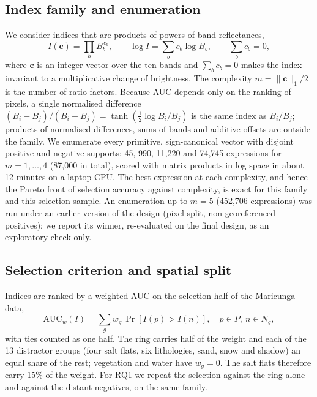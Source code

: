 \documentclass[preprint,authoryear,number]{elsarticle}
\begin{document}
\subsection{Index family and enumeration}
\label{sec:enumeration}

We consider indices that are products of powers of band reflectances,
\begin{equation}
I(\mathbf{c}) = \prod_{b} B_b^{\,c_b}, \qquad \log I = \sum_{b} c_b \log B_b, \qquad \sum_b c_b = 0,
\label{eq:family}
\end{equation}
where $\mathbf{c}$ is an integer vector over the ten bands and $\sum_b c_b = 0$ makes the index invariant to a multiplicative change of brightness. The complexity $m = \lVert \mathbf{c} \rVert_1 / 2$ is the number of ratio factors. Because AUC depends only on the ranking of pixels, a single normalised difference $(B_i - B_j)/(B_i + B_j) = \tanh(\tfrac{1}{2}\log B_i/B_j)$ is the same index as $B_i/B_j$; products of normalised differences, sums of bands and additive offsets are outside the family. We enumerate every primitive, sign-canonical vector with disjoint positive and negative supports: 45, 990, 11{,}220 and 74{,}745 expressions for $m = 1, \dots, 4$ (87{,}000 in total), scored with matrix products in log space in about 12 minutes on a laptop CPU. The best expression at each complexity, and hence the Pareto front of selection accuracy against complexity, is exact for this family and this selection sample. An enumeration up to $m = 5$ (452{,}706 expressions) was run under an earlier version of the design (pixel split, non-georeferenced positives); we report its winner, re-evaluated on the final design, as an exploratory check only.

\subsection{Selection criterion and spatial split}
\label{sec:split}

Indices are ranked by a weighted AUC on the selection half of the Maricunga data,
\begin{equation}
\mathrm{AUC}_w(I) = \sum_g w_g \, \Pr\left[I(p) > I(n)\right], \quad p \in P,\ n \in N_g,
\label{eq:wauc}
\end{equation}
with ties counted as one half. The ring carries half of the weight and each of the 13 distractor groups (four salt flats, six lithologies, sand, snow and shadow) an equal share of the rest; vegetation and water have $w_g = 0$. The salt flats therefore carry 15\% of the weight. For RQ1 we repeat the selection against the ring alone and against the distant negatives, on the same family.
\end{document}
